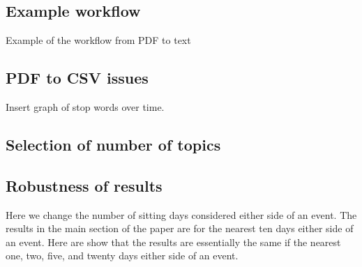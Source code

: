 \documentclass[12pt,]{article}
\theoremstyle{definition}
\theoremstyle{definition}
\theoremstyle{definition}
\theoremstyle{remark}
\begin{document}
\subsection{Example workflow}\label{example-workflow}

Example of the workflow from PDF to text

\subsection{PDF to CSV issues}\label{pdf-to-csv-issues}

Insert graph of stop words over time.

\subsection{Selection of number of
topics}\label{selection-of-number-of-topics}

\subsection{Robustness of results}\label{robustness-of-results}

Here we change the number of sitting days considered either side of an
event. The results in the main section of the paper are for the nearest
ten days either side of an event. Here are show that the results are
essentially the same if the nearest one, two, five, and twenty days
either side of an event.

\newpage




\newpage
\singlespacing 
\renewcommand\refname{References}

\end{document}
